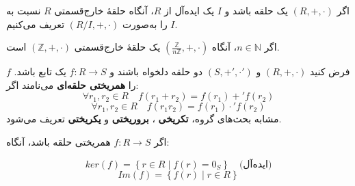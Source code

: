 \begin{frame}
    \begin{definition}
        اگر $(R, +, \cdot)$ یک حلقه باشد و $I$ یک ایده‌آل از $R$، آنگاه حلقهٔ خارج‌قسمتی $R$ نسبت به $I$ را به‌صورت $(R/I, +, \cdot)$ تعریف می‌کنیم.

    \end{definition}



    \begin{example}
        اگر $n \in \mathbb{N}$، آنگاه $( \frac{\mathbb{Z}}{n\mathbb{Z}}, +, \cdot)$ یک حلقهٔ خارج‌قسمتی $( \mathbb{Z}, +, \cdot)$
        است.
    \end{example}


    \begin{definition}
        فرض کنید $(R,+,\cdot)$ و $(S,+',\cdot')$ دو حلقه دلخواه باشند و $f \colon R \to S$ یک تابع باشد. $f$ را \textbf{همریختی حلقه‌ای} می‌نامند اگر:
        \[
            \forall r_1, r_2 \in R \quad f(r_1 + r_2) = f(r_1) +' f(r_2)
        \]
        \[
            \forall r_1, r_2 \in R \quad f(r_1 r_2) = f(r_1) \cdot' f(r_2)
        \]
        مشابه بحث‌های گروه، \textbf{تکریخی} ، \textbf{بروریختی} و \textbf{یکریختی} تعریف می‌شود.
    \end{definition}

\end{frame}


\begin{frame}
    \begin{definition}
        اگر $f \colon R \to S$ همریختی حلقه باشد، آنگاه:

        \[
            ker(f) = \left\{ r \in R \mid f(r) = 0_S \right\} \quad \text{(ایده‌آل)}
        \]
        \[
            Im(f) = \left\{ f(r) \mid r \in R \right\}
        \]
    \end{definition}


\end{frame}

